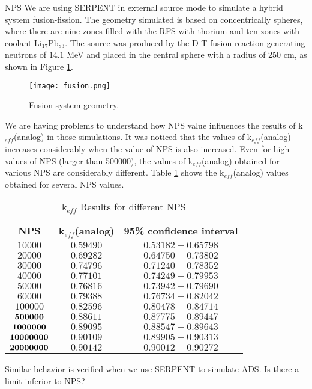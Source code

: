\documentclass{article}
\begin{document}
\begin{section}{NPS}
We are using SERPENT in external source mode to simulate a hybrid system fusion-fission. The geometry simulated is based on concentrically spheres, where there are nine zones filled with the RFS with thorium and ten zones with coolant Li$_{17}$Pb$_{83}$. The source was produced by the D-T fusion reaction generating neutrons of $14.1$ MeV and placed in the central sphere with a radius of 250 cm, as shown in Figure \ref{fusion}. 

\begin{figure}[htb!]
\centering
\texttt{[image: fusion.png]}
\caption{Fusion system geometry.}
\label{fusion}
\end{figure}

We are having problems to understand how NPS value influences the results of k$_{eff}$(analog) in those simulations. It was noticed that the values of k$_{eff}$(analog) increases considerably when the value of NPS is also increased. Even for high values of NPS (larger than 500000), the values of  k$_{eff}$(analog) obtained for various NPS are considerably different. Table \ref{NPS} shows the k$_{eff}$(analog) values obtained for several NPS values. 

\begin{table}[htb!]
\caption{k$_{eff}$ Results for different NPS}
\label{NPS}
\centering
\vspace{0.5cm}
\begin{tabular}{c|c|c}\hline
NPS & k$_{eff}$(analog) & 95\% confidence interval\\ \hline

$10000$ & $0.59490$ & $0.53182-0.65798$\\ \hline
$20000$ & $0.69282$ & $0.64750-0.73802$\\ \hline
$30000$ & $0.74796$ & $0.71240-0.78352$\\ \hline
$40000$ & $0.77101$ & $0.74249-0.79953$\\ \hline
$50000$ & $0.76816$ & $0.73942-0.79690$\\ \hline
$60000$ & $0.79388$ & $0.76734-0.82042$\\ \hline
$100000$ & $0.82596$ & $0.80478-0.84714$\\ \hline
${\bf 500000}$ & $0.88611$ & $0.87775-0.89447$\\ \hline
${\bf 1000000}$ & $0.89095$ & $0.88547-0.89643$\\ \hline
${\bf 10000000}$ & $0.90109$ & $0.89905-0.90313$\\ \hline
${\bf 20000000}$ & $0.90142$ & $0.90012-0.90272$\\ \hline
\end{tabular}
\end{table}

Similar behavior is verified when we use SERPENT to simulate ADS. Is there a limit inferior to NPS?
\end{section}
\end{document}
